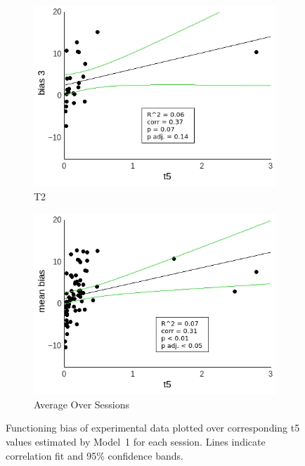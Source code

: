 \documentclass[a4paper]{scrreprt}
\begin{document}
\begin{figure}
\begin{subfigure}[b]{0.49\textwidth}
        \includegraphics[width=\textwidth]{figs/sec3/t5/t5_diff_3_mod1dat.jpeg}
        \caption{T2}
    \end{subfigure}
    \begin{subfigure}[b]{0.49\textwidth}
        \includegraphics[width=\textwidth]{figs/sec3/t5/t5_diff_mean_mod1dat.jpeg}
        \caption{Average Over Sessions}
    \end{subfigure}
\caption{Functioning bias of experimental data plotted over corresponding t5 values estimated by Model~1 for each session. Lines indicate correlation fit and 95\% confidence bands.}
\label{fig:t5_diff_mod1dat}
\end{figure}
\end{document}
